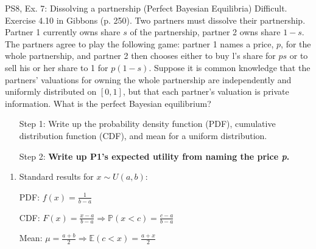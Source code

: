 \begin{frame}{PS8, Ex. 7: Dissolving a partnership (Perfect Bayesian Equilibria)}
    Difficult. Exercise 4.10 in Gibbons (p. 250). Two partners must dissolve their partnership. Partner 1 currently owns share $s$ of the partnership, partner 2 owns share $1-s$. The partners agree to play the following game: partner 1 names a price, $p$, for the whole partnership, and partner 2 then chooses either to buy l's share for $ps$ or to sell his or her share to 1 for $p(1-s)$. Suppose it is common knowledge that the partners' valuations for owning the whole partnership are independently and uniformly distributed on $[0,1]$, but that each partner's valuation is private information. What is the perfect Bayesian equilibrium?\vspace{-8pt}
    \begin{multicols}{2}
      \begin{itemize}
        \item[Step 1:] Write up the probability density function (PDF), cumulative distribution function (CDF), and mean for a uniform distribution.
        \item[Step 2:] \textbf{Write up P1's expected utility from naming the price \textit{p}.}
      \end{itemize}
      \vfill\null\columnbreak
      \begin{enumerate}
        \item Standard results for $x\sim U(a, b):$
        \item[PDF:]  $f(x)=\frac{1}{b-a}$
        \item[CDF:]  $F(x)=\frac{x-a}{b-a}\Rightarrow\mathbb{P}(x<c)=\frac{c-a}{b-a}$
        \item[Mean:] $\mu=\frac{a+b}{2}\Rightarrow\mathbb{E}(c<x)=\frac{a+x}{2}$
      \end{enumerate}
      \vfill\null
    \end{multicols}
\end{frame}
